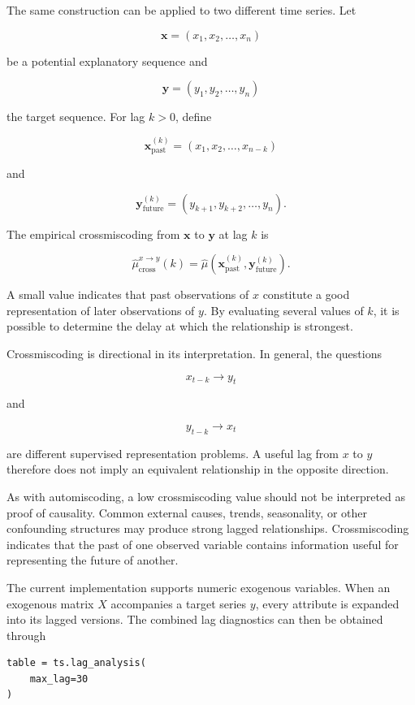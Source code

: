 The same construction can be applied to two different time series. Let

\[
\mathbf{x}
=
(x_1,x_2,\ldots,x_n)
\]

be a potential explanatory sequence and

\[
\mathbf{y}
=
(y_1,y_2,\ldots,y_n)
\]

the target sequence. For lag \(k>0\), define

\[
\mathbf{x}^{(k)}_{\mathrm{past}}
=
(x_1,x_2,\ldots,x_{n-k})
\]

and

\[
\mathbf{y}^{(k)}_{\mathrm{future}}
=
(y_{k+1},y_{k+2},\ldots,y_n).
\]

The empirical crossmiscoding from \(\mathbf{x}\) to \(\mathbf{y}\) at lag
\(k\) is

\[
\widehat\mu_{\mathrm{cross}}^{x\rightarrow y}(k)
=
\widehat\mu
\left(
\mathbf{x}^{(k)}_{\mathrm{past}},
\mathbf{y}^{(k)}_{\mathrm{future}}
\right).
\]

A small value indicates that past observations of \(x\) constitute a good
representation of later observations of \(y\). By evaluating several values of
\(k\), it is possible to determine the delay at which the relationship is
strongest.

Crossmiscoding is directional in its interpretation. In general, the questions

\[
x_{t-k}\rightarrow y_t
\]

and

\[
y_{t-k}\rightarrow x_t
\]

are different supervised representation problems. A useful lag from \(x\) to
\(y\) therefore does not imply an equivalent relationship in the opposite
direction.

As with automiscoding, a low crossmiscoding value should not be interpreted as
proof of causality. Common external causes, trends, seasonality, or other
confounding structures may produce strong lagged relationships. Crossmiscoding
indicates that the past of one observed variable contains information useful for
representing the future of another.

The current implementation supports numeric exogenous variables. When an
exogenous matrix \(X\) accompanies a target series \(y\), every attribute is
expanded into its lagged versions. The combined lag diagnostics can then be
obtained through

\begin{sourcecode}
{\scriptsize
\begin{verbatim}
table = ts.lag_analysis(
    max_lag=30
)
\end{verbatim}}
\end{sourcecode}

